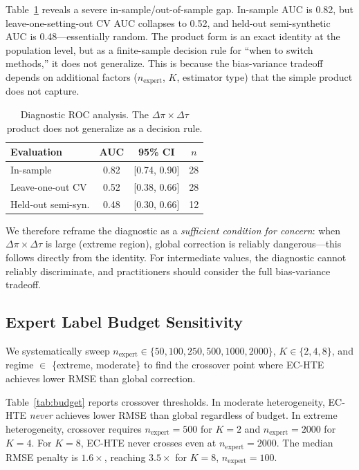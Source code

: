 \documentclass[11pt]{article}
\begin{document}
Table~\ref{tab:diagnostic} reveals a severe in-sample/out-of-sample gap.
In-sample AUC is 0.82, but leave-one-setting-out CV AUC collapses to 0.52, and held-out semi-synthetic AUC is 0.48---essentially random.
The product form is an exact identity at the population level, but as a finite-sample decision rule for ``when to switch methods,'' it does not generalize.
This is because the bias-variance tradeoff depends on additional factors ($n_{\text{expert}}$, $K$, estimator type) that the simple product does not capture.

\begin{table}[t]
\centering
\small
\caption{Diagnostic ROC analysis. The $\Delta\pi \times \Delta\tau$ product does not generalize as a decision rule.}
\label{tab:diagnostic}
\begin{tabular}{@{}lccc@{}}
\toprule
Evaluation & AUC & 95\% CI & $n$ \\
\midrule
In-sample & 0.82 & [0.74, 0.90] & 28 \\
Leave-one-out CV & 0.52 & [0.38, 0.66] & 28 \\
Held-out semi-syn. & 0.48 & [0.30, 0.66] & 12 \\
\bottomrule
\end{tabular}
\end{table}

We therefore reframe the diagnostic as a \emph{sufficient condition for concern}: when $\Delta\pi \times \Delta\tau$ is large (extreme region), global correction is reliably dangerous---this follows directly from the identity.
For intermediate values, the diagnostic cannot reliably discriminate, and practitioners should consider the full bias-variance tradeoff.

\subsection{Expert Label Budget Sensitivity}
\label{sec:exp-budget}

We systematically sweep $n_{\text{expert}} \in \{50, 100, 250, 500, 1000, 2000\}$, $K \in \{2, 4, 8\}$, and regime $\in$ \{extreme, moderate\} to find the crossover point where EC-HTE achieves lower RMSE than global correction.

Table~\ref{tab:budget} reports crossover thresholds.
In moderate heterogeneity, EC-HTE \emph{never} achieves lower RMSE than global regardless of budget.
In extreme heterogeneity, crossover requires $n_{\text{expert}} = 500$ for $K{=}2$ and $n_{\text{expert}} = 2000$ for $K{=}4$.
For $K{=}8$, EC-HTE never crosses even at $n_{\text{expert}} = 2000$.
The median RMSE penalty is $1.6\times$, reaching $3.5\times$ for $K{=}8$, $n_{\text{expert}}{=}100$.
\end{document}
